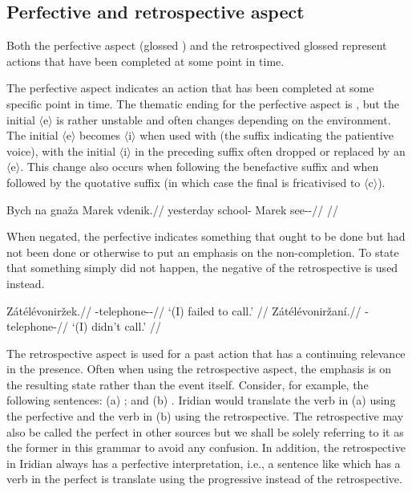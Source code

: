 \subsection{Perfective and retrospective aspect}\label{sec:perfective-retrospective}

Both the perfective aspect (glossed \Pf{}) and the retrospectived {glossed \Ret{}} represent actions that have been completed at some point in time.

The perfective aspect indicates an action that has been completed at some specific point in time. The thematic ending for the perfective aspect is , but the initial $\langle$e$\rangle$ is rather unstable and often changes depending on the environment. The initial $\langle$e$\rangle$ becomes $\langle$i$\rangle$ when used with  (the suffix indicating the patientive voice), with the initial $\langle$i$\rangle$ in the preceding suffix often dropped or replaced by an $\langle$e$\rangle$. This change also occurs when following the benefactive suffix  and when followed by the quotative suffix  (in which case the final  is fricativised to $\langle$c$\rangle$).

\pex
\begingl
\gla Bych na gnaža Marek vdenik.//
\glb yesterday \Loc{} school-\Acc{} Marek see-\Pv{}-\Pf{}//
\glft {}//
\endgl
\xe

When negated, the perfective indicates something that ought to be done but had not been done or otherwise to put an emphasis on the non-completion. To state that something simply did not happen, the negative of the retrospective is used instead.

\begin{multicols}{2}
\pex
\a\begingl
\gla Zátélévoniržek.//
\glb \Neg{}-telephone-\Av{}-\Pf{}//
\glft `(I) failed to call.' //
\endgl
\a\begingl
\gla Zátélévoniržaní.//
\glb \Neg{}-telephone-//
\glft `(I) didn't call.' //
\endgl
\xe
\end{multicols}

\par The retrospective aspect is used for a past action that has a continuing relevance in the presence. Often when using the retrospective aspect, the emphasis is on the resulting state rather than the event itself. Consider, for example, the following sentences: (a) ; and (b) . Iridian would translate the verb in (a) using the perfective and the verb in (b) using the retrospective. The retrospective may also be called the {\cscaps perfect} in other sources but we shall be solely referring to it as the former in this grammar to avoid any confusion. In addition, the retrospective in Iridian always has a perfective interpretation, i.e., a sentence like  which has a verb in the perfect is translate using the progressive instead of the retrospective.


